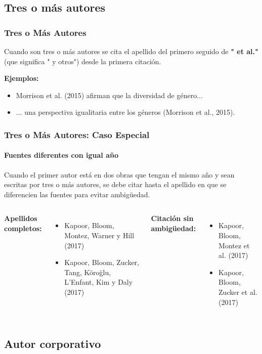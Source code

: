 \documentclass[aspectratio=169]{beamer}
\begin{document}
\subsection{Tres o más autores}

\begin{frame}
	\frametitle{Tres o Más Autores}
	Cuando son tres o más autores se cita el apellido del primero seguido de \textbf{" et al."} (que significa " y otros") desde la primera citación.
	
	\vspace{1em}
	
	\textbf{Ejemplos:}
	\begin{itemize}
		\item Morrison et al. (2015) afirman que la diversidad de género...
		\item ... una perspectiva igualitaria entre los géneros (Morrison et al., 2015).
	\end{itemize}
\end{frame}

\begin{frame}
	\frametitle{Tres o Más Autores: Caso Especial}
	\framesubtitle{Fuentes diferentes con igual año}
	
	Cuando el primer autor está en dos obras que tengan el mismo año y sean escritas por tres o más autores, se debe citar hasta el apellido en que se diferencien las fuentes para evitar ambigüedad.
	
	\vspace{0.5em}
	
	\begin{columns}
		\textbf{Apellidos completos:}
		\begin{itemize}
			\item Kapoor, Bloom, Montez, Warner y Hill (2017)
			\item Kapoor, Bloom, Zucker, Tang, Köroğlu, L'Enfant, Kim y Daly (2017)
		\end{itemize}
		
		\textbf{Citación sin ambigüedad:}
		\begin{itemize}
			\item Kapoor, Bloom, Montez et al. (2017)
			\item Kapoor, Bloom, Zucker et al. (2017)
		\end{itemize}
	\end{columns}
\end{frame}

\subsection{Autor corporativo}
\end{document}
